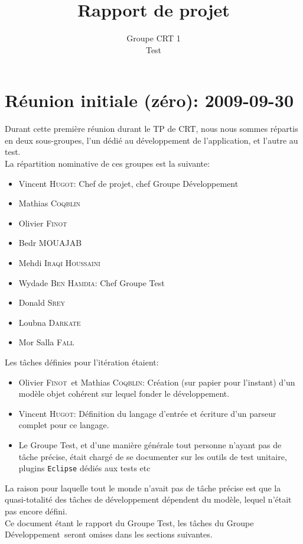 \documentclass[a4paper,12pt]{article}
\author{Groupe CRT 1\\Test}
\title{Rapport de projet}
\def\familyname{\textsc}
\def\firstname#1{#1}
\def\groupmember#1#2{\firstname{#1} \familyname{#2}}
\def\mwyd{\groupmember{Wydade}{Ben Hamdia}}
\def\mmat{\groupmember{Mathias}{Coqblin}}
\def\mlou{\groupmember{Loubna}{Darkate}}
\def\mmor{\groupmember{Mor Salla}{Fall}}
\def\moli{\groupmember{Olivier}{Finot}}
\def\mvin{\groupmember{Vincent}{Hugot}}
\def\mmed{\groupmember{Mehdi}{Iraqi Houssaini}}
\def\mbed{\groupmember{Bedr}{MOUAJAB}}
\def\mdon{\groupmember{Donald}{Srey}}
\def\grpd{Groupe Développement}
\def\grpt{Groupe Test}
\begin{document}
 
\maketitle

\tableofcontents

\section{Réunion initiale (zéro): 2009-09-30}

Durant cette première réunion durant le TP de CRT, nous 
nous sommes répartis en deux sous-groupes, l'un dédié au développement
de l'application, et l'autre au test.\mk\\
%
La répartition nominative de ces groupes est la suivante:
\begin{itemize}
\item \mvin : Chef de projet, chef \grpd
\item \mmat
\item \moli
\item \mbed
\item \mmed\mk\\
\end{itemize}


\begin{itemize}
\item \mwyd : Chef \grpt
\item \mdon
\item \mlou
\item \mmor
\end{itemize}


\noi Les tâches définies pour l'itération étaient:

\begin{itemize}
 \item \moli\ et \mmat: Création (sur papier pour l'instant) d'un modèle objet cohérent sur lequel fonder le développement.
\item  \mvin : Définition du langage d'entrée et écriture d'un parseur complet pour ce langage.
\item Le \grpt, et d'une manière générale tout personne n'ayant pas de tâche précise,
était chargé de se documenter sur les outils de test
unitaire, plugins \texttt{Eclipse} dédiés aux tests etc
\end{itemize}
La raison pour laquelle tout le monde n'avait pas de tâche précise est que la 
quasi-totalité des tâches de développement dépendent du modèle, lequel n'était 
pas encore défini.\mk\\
%
Ce document étant le rapport du \grpt, les tâches du \grpd\ seront
omises dans les sections suivantes.
\end{document}
